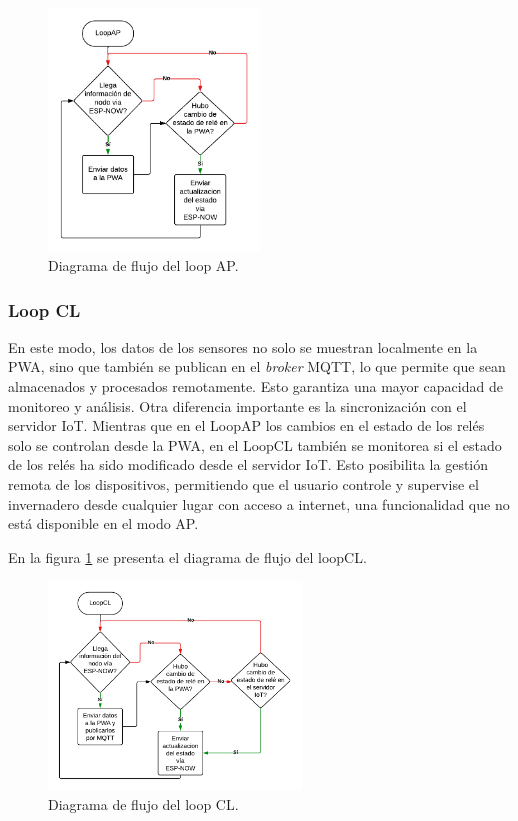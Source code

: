 \begin{figure}[H]
\centering 
\includegraphics[width=0.5\textwidth]{./Figures/flujo_ap.png}
\caption{Diagrama de flujo del loop AP.}
\label{fig:flujoAP}
\end{figure}

\subsubsection{Loop CL}

En este modo, los datos de los sensores no solo se muestran localmente en la PWA, sino que también se publican en el \textit{broker} MQTT, lo que permite que sean almacenados y procesados remotamente. Esto garantiza una mayor capacidad de monitoreo y análisis.
Otra diferencia importante es la sincronización con el servidor IoT. Mientras que en el LoopAP los cambios en el estado de los relés solo se controlan desde la PWA, en el LoopCL también se monitorea si el estado de los relés ha sido modificado desde el servidor IoT. Esto posibilita la gestión remota de los dispositivos, permitiendo que el usuario controle y supervise el invernadero desde cualquier lugar con acceso a internet, una funcionalidad que no está disponible en el modo AP.

En la figura \ref{fig:flujoAP} se presenta el diagrama de flujo del loopCL. 

\begin{figure}[H]
\centering 
\includegraphics[width=0.6\textwidth]{./Figures/flujo_cl.png}
\caption{Diagrama de flujo del loop CL.}
\label{fig:flujoCL}
\end{figure}

